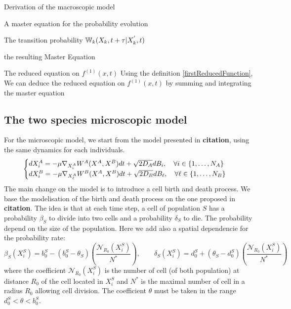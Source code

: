 \begin{paragraph}{Derivation of the macroscopic model}
\begin{paragraph}{A master equation for the probability evolution}
\begin{paragraph}{The transition probability ${\mathbb{W}}_k(X_k, t+\tau \vert X_k^{'},t)$}
\begin{paragraph}{the resulting Master Equation}
\end{paragraph}

\end{paragraph}

\end{paragraph}

\begin{paragraph}{The reduced equation on $f^{(1)}(x,t)$}
Using the definition \eqref{firstReducedFunction}, We can deduce the reduced equation on $f^{(1)}(x,t)$ by summing and integrating the master equation
\end{paragraph}

\end{paragraph}


\subsection{The two species microscopic model}
	For the microscopic model, we start from the model presented in \textbf{citation}, using the same dynamics for each individuals.
	\begin{equation}
	\begin{cases}
	d X_i^{A}=-\mu \nabla_{X_{i}^{A}}W^{A}(X^{A},X^{B})dt + \sqrt{2D_{A}} d B_{i}, \quad \forall i \in\{1, \dots, N_{A}\}
	\\
	d X_i^{B}=-\mu \nabla_{X_{{\ell}}^{A}}W^{B}(X^{A},X^{B})dt + \sqrt{2D_{B}} d B_{{\ell}}, \quad \forall {\ell} \in \{1, \dots, N_{B}\}
	\end{cases}
	\end{equation}
	The main change on the model is to introduce a cell birth and death process. We base the modelisation of the birth and death process on the one proposed in \textbf{citation}. The idea is that at each time step, a cell of population $S$ has a probability $\beta_S$ to divide into two cells and a probability $\delta_S$ to die. The probability depend on the size of the population. Here we add also a spatial dependencie for the probability rate:
	\begin{equation}
\beta_{S}(X_i^S)=b_{0}^{S}-(b_{0}^{S}-\theta_{S})\left(\frac{\mathcal{N}_{R_0}(X_i^S)}{N^{*}}\right), \quad\quad \delta_{S}(X_i^S)=d_{0}^{S}+(\theta_{S}-d_{0}^{S})\left(\frac{\mathcal{N}_{R_0}(X_i^S)}{N^{*}}\right)
\end{equation}
	where the coefficient $\mathcal{N}_{R_0}(X_i^S)$ is the number of cell (of both population) at distance $R_0$ of the cell located in $X_i^S$ and $N^*$ is the maximal number of cell in a radius $R_0$ allowing cell division. The coefficient $\theta$ must be taken in the range $d_{0}^{S}<\theta<b_{0}^{S}$.


